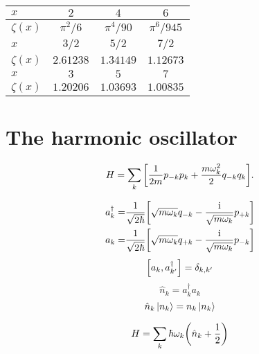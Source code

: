 \documentclass[11pt,letter, swedish, english, twocolumn
]{article}
\begin{document}
\begin{center}
\begin{tabular}{|l||c|c|c|}\hline
$x$ & $2$ & $4$ & $6$
\\ \hline $\zeta(x)$ & 
$\pi^2/6$ & $\pi^4/90$ & $\pi^6/945$ 
\\ \hline\hline
$x$ & $3/2$ & $5/2$ & $7/2$
\\ \hline $\zeta(x)$ & 
$2.61238$ & $1.34149$ & $1.12673$ 
\\ \hline\hline
$x$ & $3$ & $5$ & $7$
\\ \hline$\zeta(x)$ & 
$1.20206$ & $1.03693$ & $1.00835$ 
\\ \hline
\end{tabular}
\end{center}



\section{The harmonic oscillator}
\begin{equation}
H=\sum_{k}\qty[\frac{1}{2m}p_{-k}p_{k}+\frac{m\omega_k^2}{2}q_{-k}q_{k}].
\end{equation}

\begin{equation}
\begin{aligned}
a_k^\dagger =& \frac{1}{\sqrt{2\hbar}}
\qty[\sqrt{m\omega_k}q_{-k} - \frac{\mathrm{i}}{\sqrt{m\omega_k}}p_{+k}]\\
a_k =& \frac{1}{\sqrt{2\hbar}}
\qty[\sqrt{m\omega_k}q_{+k} - \frac{\mathrm{i}}{\sqrt{m\omega_k}}p_{-k}]\\
\end{aligned}
\end{equation}
\begin{equation}
\comm{a_k}{a_{k'}^\dagger}=\delta_{k,k'}
\end{equation}
\begin{equation}
\hat{n}_k=a_k^\dagger a_k
\end{equation}
\begin{equation}
\hat{n}_k\ket{n_k}=n_k\ket{n_k}
\end{equation}

\begin{equation}
H=\sum_k \hbar\omega_k\qty(\hat{n}_k+\frac{1}{2})
\end{equation}
\end{document}
